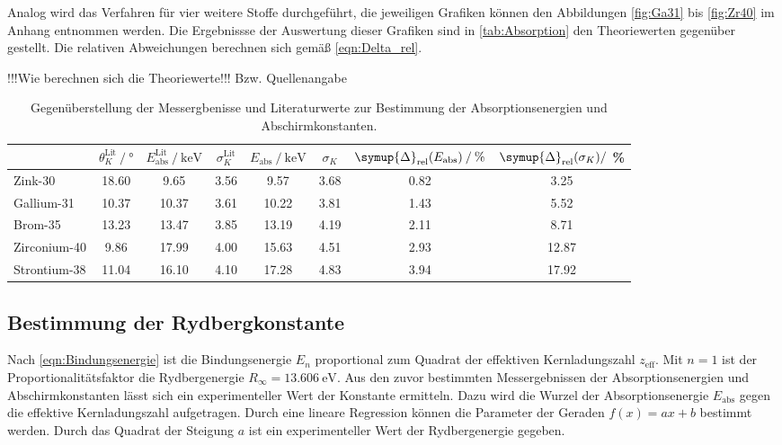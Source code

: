 Analog wird das Verfahren für vier weitere Stoffe durchgeführt, die jeweiligen Grafiken können den Abbildungen \ref{fig:Ga31} bis \ref{fig:Zr40} im Anhang 
entnommen werden.  Die Ergebnissse der Auswertung dieser Grafiken sind in \autoref{tab:Absorption} den Theoriewerten gegenüber gestellt.
Die relativen Abweichungen berechnen sich gemäß \autoref{eqn:Delta_rel}.

!!!Wie berechnen sich die Theoriewerte!!! Bzw. Quellenangabe

\begin{table}
  \centering
  \caption{Gegenüberstellung der Messergbenisse und Literaturwerte zur Bestimmung der Absorptionsenergien und Abschirmkonstanten.}
  \label{tab:Absorption}
  \begin{tabular}{l S[table-format = 2.2] S S[table-format = 1.2] S[table-format = 2.2] S[table-format = 1.2] S S[table-format = 2.2]}
    \toprule
     {} & {$\theta^\text{Lit}_K \mathbin{/} \unit{\degree}$} & {$E^\text{Lit}_\text{abs} \mathbin{/} \unit{\kilo\electronvolt}$} &%
     {$\sigma^\text{Lit}_K$} & {$E_\text{abs} \mathbin{/} \unit{\kilo\electronvolt}$} & {$\sigma_K$} & {$\symup{\Delta}_\text{rel}(E_\text{abs}) \mathbin{/} \%$} &%
     {$\symup{\Delta}_\text{rel}(\sigma_K) \mathbin{/}$ \%}\\
    \midrule
      {Zink-30}      & 18.60 &  9.65 & 3.56 &  9.57 & 3.68 & 0.82 &  3.25 \\ 
      {Gallium-31}   & 10.37 & 10.37 & 3.61 & 10.22 & 3.81 & 1.43 &  5.52 \\
      {Brom-35}      & 13.23 & 13.47 & 3.85 & 13.19 & 4.19 & 2.11 &  8.71 \\
      {Zirconium-40} &  9.86 & 17.99 & 4.00 & 15.63 & 4.51 & 2.93 & 12.87 \\
      {Strontium-38} & 11.04 & 16.10 & 4.10 & 17.28 & 4.83 & 3.94 & 17.92 \\
    \bottomrule
  \end{tabular}
\end{table}

\subsection{Bestimmung der Rydbergkonstante}
\label{subsec:Rydberg}
Nach \autoref{eqn:Bindungsenergie} ist die Bindungsenergie $E_n$ proportional zum Quadrat der effektiven Kernladungszahl $z_\text{eff}$. Mit $n = 1$ ist der 
Proportionalitätsfaktor die Rydbergenergie $R_\infty = \qty{13.606}{\electronvolt}$. Aus den zuvor bestimmten Messergebnissen der Absorptionsenergien und 
Abschirmkonstanten lässt sich ein experimenteller Wert der Konstante ermitteln. Dazu wird die Wurzel der Absorptionsenergie $E_\text{abs}$ gegen die effektive
Kernladungszahl aufgetragen. Durch eine lineare Regression können die Parameter der Geraden $f(x) = ax + b$ bestimmt werden. Durch das Quadrat der Steigung $a$ 
ist ein experimenteller Wert der Rydbergenergie gegeben.

